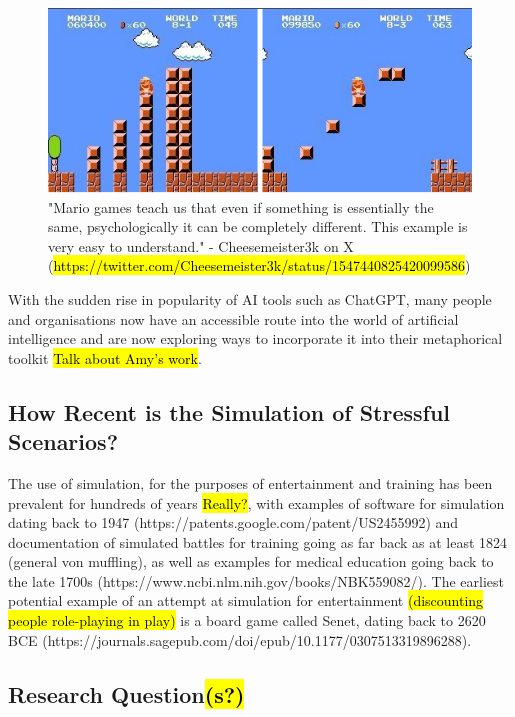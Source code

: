 \documentclass{article}
\begin{document}
\begin{figure}[ht]
    \centering
    \begin{minipage}[b]{0.9\linewidth}
      \includegraphics[width=\linewidth]{Images/cheeseMeister3kMario.png}
      \caption{"Mario games teach us that even if something is essentially the same, psychologically it can be completely different. This example is very easy to understand." - Cheesemeister3k on X (\hl{https://twitter.com/Cheesemeister3k/status/1547440825420099586})}
      \label{fig:image1}
    \end{minipage}
  \end{figure}

With the sudden rise in popularity of AI tools such as ChatGPT, many people and organisations now have an accessible route into the world of artificial intelligence and are now exploring ways to incorporate it into their metaphorical toolkit \hl{Talk about Amy's work}. 

\subsection{How Recent is the Simulation of Stressful Scenarios?}

The use of simulation, for the purposes of entertainment and training has been prevalent for hundreds of years \hl{Really?}, with examples of software for simulation dating back to 1947 (https://patents.google.com/patent/US2455992) and documentation of simulated battles for training going as far back as at least 1824 (general von muffling), as well as examples for medical education going back to the late 1700s (https://www.ncbi.nlm.nih.gov/books/NBK559082/). The earliest potential example of an attempt at simulation for entertainment \hl{(discounting people role-playing in play)} is a board game called Senet, dating back to 2620 BCE (https://journals.sagepub.com/doi/epub/10.1177/0307513319896288).


  \subsection{Research Question\hl{(s?)}}
  
\end{document}
